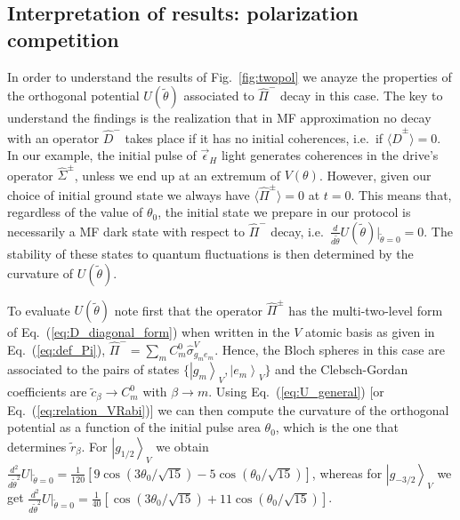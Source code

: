 \documentclass[aps,prx,superscriptaddress,twocolumn,notitlepage,nofootinbib,longbibliography]{revtex4-2}
\newcommand{\ket}[1]{\left|#1\right>}
\begin{document}

\subsection{Interpretation of results: polarization competition}

In order to understand the results of Fig.~\ref{fig:twopol} we anayze the properties of the orthogonal potential $U(\tilde\theta)$ associated to $\hat{\Pi}^-$ decay in this case.
The key to understand the findings is the realization that in MF approximation no decay with an operator $\hat{D}^-$ takes place if it has no initial coherences, i.e.~if $\langle \hat{D}^\pm \rangle=0$.
In our example, the initial pulse of $\vec{\epsilon}_H$ light generates coherences in the drive's operator $\hat{\Sigma}^\pm$, unless we end up at an extremum of $V(\theta)$. However, given our choice of initial ground state we always have $\langle\hat{\Pi}^\pm\rangle=0$ at $t=0$. This means that, regardless of the value of $\theta_0$, the initial state we prepare in our protocol is necessarily a MF dark state with respect to $\hat{\Pi}^-$ decay, i.e.~$\frac{d}{d\tilde\theta}U(\tilde\theta)\big|_{\tilde\theta=0}=0$. The stability of these states to quantum fluctuations is then determined by the curvature of $U(\tilde\theta)$.

To evaluate $U(\tilde\theta)$ note first that the operator $\hat{\Pi}^\pm$ has the multi-two-level form of Eq.~(\ref{eq:D_diagonal_form}) when written in the $V$ atomic basis as given in Eq.~(\ref{eq:def_Pi}), $\hat{\Pi}^- = \sum_{m} C^0_m \hat{\sigma}^V_{g_m e_m}$. Hence, the Bloch spheres in this case are associated to the pairs of states $\{\ket{g_m}_V,\ket{e_m}_V\}$ and the Clebsch-Gordan coefficients are $\tilde{c}_\beta \rightarrow C^{0}_m$ with $\beta\rightarrow m$.
Using Eq.~(\ref{eq:U_general}) [or Eq.~(\ref{eq:relation_VRabi})] we can then compute the curvature of the orthogonal potential as a function of the initial pulse area $\theta_0$, which is the one that determines $\tilde{r}_\beta$. For $\ket{g_{1/2}}_V$ we obtain $\frac{d^2}{d\tilde\theta^2}U\big|_{\tilde\theta=0} = \frac{1}{120} [ 9 \cos(3\theta_0/\sqrt{15}) - 5 \cos(\theta_0/\sqrt{15})]$, whereas for $\ket{g_{-3/2}}_V$ we get $\frac{d^2}{d\tilde\theta^2}U\big|_{\tilde\theta=0} = \frac{1}{40} [ \cos(3\theta_0/\sqrt{15}) + 11 \cos(\theta_0/\sqrt{15})]$.
\end{document}
